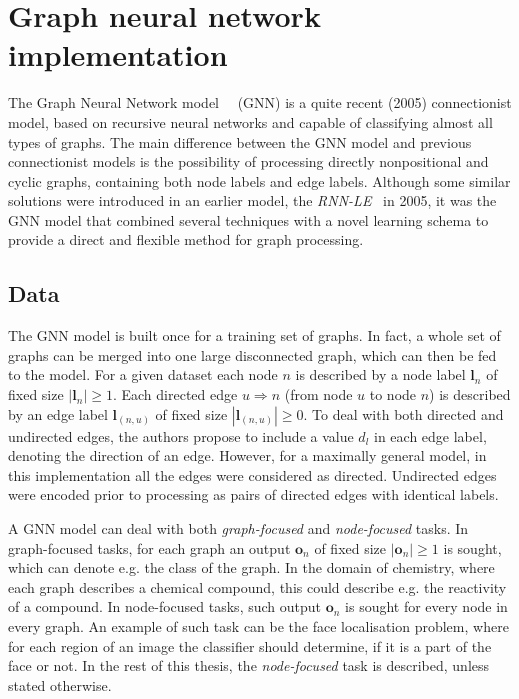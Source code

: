 
\chapter{Graph neural network implementation}

The Graph Neural Network model~\cite{gori2005new}~\cite{scarselli2009graph} (GNN) is a quite recent (2005) connectionist model, based on recursive neural networks and capable of classifying almost all types of graphs. The main difference between the GNN model and previous connectionist models is the possibility of processing directly nonpositional and cyclic graphs, containing both node labels and edge labels. Although some similar solutions were introduced in an earlier model, the \emph{RNN-LE}~\cite{bianchini2005recursive} in 2005, it was the GNN model that combined several techniques with a novel learning schema to provide a direct and flexible method for graph processing.

\section{Data}
The GNN model is built once for a training set of graphs. In fact, a whole set of graphs can be merged into one large disconnected graph, which can then be fed to the model. For a given dataset each node $n$ is described by a node label $\bm{l}_n$ of fixed size $|\bm{l}_n| \geq 1$. Each directed edge $u \Rightarrow n$ (from node $u$ to node $n$) is described by an edge label $\bm{l}_{(n, u)}$ of fixed size $|\bm{l}_{(n, u)}| \geq 0$. To deal with both directed and undirected edges, the authors propose to include a value $d_l$ in each edge label, denoting the direction of an edge. However, for a maximally general model, in this implementation all the edges were considered as directed. Undirected edges were encoded prior to processing as pairs of directed edges with identical labels.

A GNN model can deal with both \emph{graph-focused} and \emph{node-focused} tasks. In graph-focused tasks, for each graph an output $\bm{o}_n$ of fixed size $|\bm{o}_n| \geq 1$ is sought, which can denote e.g. the class of the graph. In the domain of chemistry, where each graph describes a chemical compound, this could describe e.g. the reactivity of a compound. In node-focused tasks, such output $\bm{o}_n$ is sought for every node in every graph. An example of such task can be the face localisation problem, where for each region of an image the classifier should determine, if it is a part of the face or not. In the rest of this thesis, the \emph{node-focused} task is described, unless stated otherwise.

